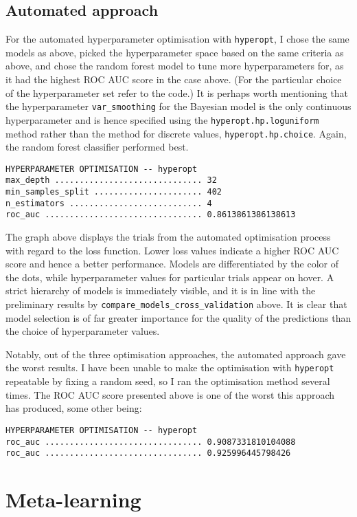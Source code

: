\documentclass[12pt, a4paper]{article}
\begin{document}
\subsection{Automated approach}
For the automated hyperparameter optimisation with \verb|hyperopt|, I chose the same models as above, picked the hyperparameter
space based on the same criteria as above, and chose the random forest model to tune more hyperparameters for, as it had the highest
ROC AUC score in the case above. (For the particular choice of the hyperparameter set refer to the code.) It is perhaps worth mentioning
that the hyperparameter \verb|var_smoothing| for the Bayesian model is the only continuous hyperparameter and is hence specified
using the \verb|hyperopt.hp.loguniform| method rather than the method for discrete values, \verb|hyperopt.hp.choice|. Again, the
random forest classifier performed best.

\begin{verbatim}
HYPERPARAMETER OPTIMISATION -- hyperopt
max_depth .............................. 32
min_samples_split ...................... 402
n_estimators ........................... 4
roc_auc ................................ 0.8613861386138613
\end{verbatim}

\begin{center}
\end{center}

The graph above displays the trials from the automated optimisation process with regard to the loss function. Lower loss
values indicate a higher ROC AUC score and hence a better performance. Models are differentiated by the color of the dots, while
hyperparameter values for particular trials appear on hover. A strict hierarchy of models is immediately visible, and it is in line with
the preliminary results by \verb|compare_models_cross_validation| above. It is clear that model selection is of far greater importance
for the quality of the predictions than the choice of hyperparameter values.

Notably, out of the three optimisation approaches, the automated approach gave the worst results. I have been unable to make the
optimisation with \verb|hyperopt| repeatable by fixing a random seed, so I ran the optimisation method several times. The ROC AUC
score presented above is one of the worst this approach has produced, some other being:
\begin{verbatim}
HYPERPARAMETER OPTIMISATION -- hyperopt
roc_auc ................................ 0.9087331810104088
roc_auc ................................ 0.925996445798426
\end{verbatim}

\section{Meta-learning}
\end{document}
